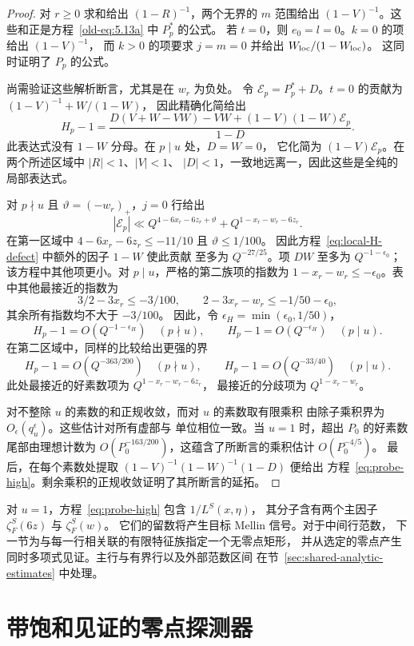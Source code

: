 \begin{proof}
对 $r\ge0$ 求和给出 $(1-R)^{-1}$，两个无界的 $m$ 范围给出
$(1-V)^{-1}$。这些和正是方程~\eqref{old-eq:5.13a} 中 $P_p^*$ 的公式。
若 $t=0$，则 $e_0=l=0$。$k=0$ 的项给出 $(1-V)^{-1}$，
而 $k>0$ 的项要求 $j=m=0$ 并给出 $W_{\rm loc}/(1-W_{\rm loc})$。
这同时证明了 $P_p$ 的公式。

尚需验证这些解析断言，尤其是在 $w_r$ 为负处。
令 $\mathcal E_p=P_p^*+D$。$t=0$ 的贡献为 $(1-V)^{-1}+W/(1-W)$，
因此精确化简给出
\begin{equation}\label{eq:local-H-defect}
 H_p-1=
 \frac{D(V+W-VW)-VW+(1-V)(1-W)\mathcal E_p}{1-D}.
\end{equation}
此表达式没有 $1-W$ 分母。在 $p\mid u$ 处，$D=W=0$，
它化简为 $(1-V)\mathcal E_p$。在两个所述区域中 $|R|<1$、$|V|<1$、
$|D|<1$，一致地远离一，因此这些是全纯的局部表达式。

对 $p\nmid u$ 且 $\vartheta=(-w_r)_+$，$j=0$ 行给出
\[
 |\mathcal E_p|\ll
 Q^{4-6x_r-6z_r+\vartheta}+Q^{1-x_r-w_r-6z_r}.
\]
在第一区域中 $4-6x_r-6z_r\le-11/10$ 且 $\vartheta\le1/100$。
因此方程~\eqref{eq:local-H-defect} 中额外的因子 $1-W$ 使此贡献
至多为 $Q^{-27/25}$。项 $DW$ 至多为 $Q^{-1-\epsilon_0}$；
该方程中其他项更小。对 $p\mid u$，严格的第二族项的指数为
$1-x_r-w_r\le-\epsilon_0$。表中其他最接近的指数为
\[
 3/2-3x_r\le-3/100,\qquad
 2-3x_r-w_r\le-1/50-\epsilon_0,
\]
其余所有指数均不大于 $-3/100$。
因此，令 $\epsilon_H=\min(\epsilon_0,1/50)$，
\[
 H_p-1=O(Q^{-1-\epsilon_H})\quad(p\nmid u),\qquad
 H_p-1=O(Q^{-\epsilon_H})\quad(p\mid u).
\]
在第二区域中，同样的比较给出更强的界
\[
 H_p-1=O(Q^{-363/200})\quad(p\nmid u),\qquad
 H_p-1=O(Q^{-33/40})\quad(p\mid u).
\]
此处最接近的好素数项为 $Q^{1-x_r-w_r-6z_r}$，
最接近的分歧项为 $Q^{1-x_r-w_r}$。

对不整除 $u$ 的素数的和正规收敛，而对 $u$ 的素数取有限乘积
由除子乘积界为 $O_\epsilon(q_u^\epsilon)$。这些估计对所有虚部与
单位相位一致。当 $u=1$ 时，超出 $P_0$ 的好素数尾部由理想计数为
$O(P_0^{-163/200})$，这蕴含了所断言的乘积估计 $O(P_0^{-4/5})$。
最后，在每个素数处提取 $(1-V)^{-1}(1-W)^{-1}(1-D)$ 便给出
方程~\eqref{eq:probe-high}。剩余乘积的正规收敛证明了其所断言的延拓。
\end{proof}

对 $u=1$，方程~\eqref{eq:probe-high} 包含 $1/L^S(x,\eta)$，
其分子含有两个主因子 $\zeta_F^S(6z)$ 与 $\zeta_F^S(w)$。
它们的留数将产生目标 Mellin 信号。对于中间行范数，
下一节为与每一行相关联的有限特征族指定一个无零点矩形，
并从选定的零点产生同时多项式见证。主行与有界行以及外部范数区间
在节~\ref{sec:shared-analytic-estimates} 中处理。

\section{带饱和见证的零点探测器}\label{sec:detector}

